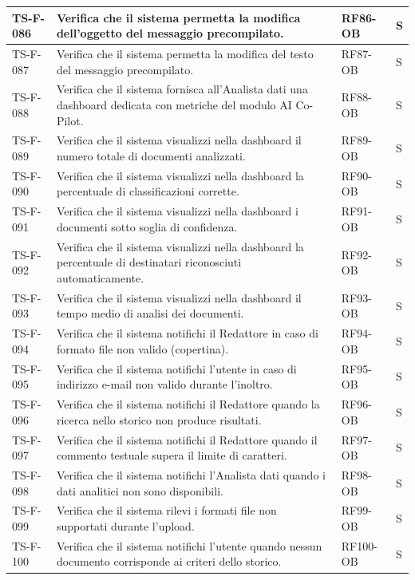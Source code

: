 \documentclass[a4paper,12pt]{article}
\begin{document}
\begin{longtable}{|p{2.2cm}|p{9.5cm}|p{2.3cm}|p{1.5cm}|}
    \hline
    TS-F-086 & Verifica che il sistema permetta la modifica dell'oggetto del messaggio precompilato. & RF86-OB & S \\
    \hline
    TS-F-087 & Verifica che il sistema permetta la modifica del testo del messaggio precompilato. & RF87-OB & S \\
    \hline
    TS-F-088 & Verifica che il sistema fornisca all'Analista dati una dashboard dedicata con metriche del modulo AI Co-Pilot. & RF88-OB & S \\
    \hline
    TS-F-089 & Verifica che il sistema visualizzi nella dashboard il numero totale di documenti analizzati. & RF89-OB & S \\
    \hline
    TS-F-090 & Verifica che il sistema visualizzi nella dashboard la percentuale di classificazioni corrette. & RF90-OB & S \\
    \hline
    TS-F-091 & Verifica che il sistema visualizzi nella dashboard i documenti sotto soglia di confidenza. & RF91-OB & S \\
    \hline
    TS-F-092 & Verifica che il sistema visualizzi nella dashboard la percentuale di destinatari riconosciuti automaticamente. & RF92-OB & S \\
    \hline
    TS-F-093 & Verifica che il sistema visualizzi nella dashboard il tempo medio di analisi dei documenti. & RF93-OB & S \\
    \hline
    TS-F-094 & Verifica che il sistema notifichi il Redattore in caso di formato file non valido (copertina). & RF94-OB & S \\
    \hline
    TS-F-095 & Verifica che il sistema notifichi l'utente in caso di indirizzo e-mail non valido durante l'inoltro. & RF95-OB & S \\
    \hline
    TS-F-096 & Verifica che il sistema notifichi il Redattore quando la ricerca nello storico non produce risultati. & RF96-OB & S \\
    \hline
    TS-F-097 & Verifica che il sistema notifichi il Redattore quando il commento testuale supera il limite di caratteri. & RF97-OB & S \\
    \hline
    TS-F-098 & Verifica che il sistema notifichi l'Analista dati quando i dati analitici non sono disponibili. & RF98-OB & S \\
    \hline
    TS-F-099 & Verifica che il sistema rilevi i formati file non supportati durante l'upload. & RF99-OB & S \\
    \hline
    TS-F-100 & Verifica che il sistema notifichi l'utente quando nessun documento corrisponde ai criteri dello storico. & RF100-OB & S \\

\end{longtable}
\end{document}
